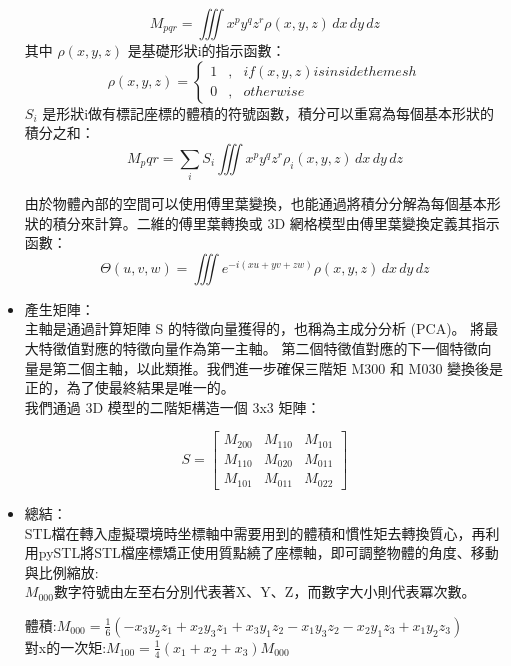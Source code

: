 \begin{itemize}
$$M_{pqr} = \iiint x^{p} y^{q} z^{r} \rho (x,y,z) \,dx\,dy\,dz$$
其中 $\rho (x,y,z)$ 是基礎形狀i的指示函數：\\
\begin{equation}
\label{eq6}
\rho (x,y,z) = \left\{
\begin{aligned}
1 & , & if (x,y,z) is inside the mesh\\
0 & , &              otherwise
\end{aligned}
\right.
\end{equation}
$S_i$ 是形狀i做有標記座標的體積的符號函數，積分可以重寫為每個基本形狀的積分之和：\\
$$M_pqr = \sum_{i} S_i \iiint x^{p} y^{q} z^{r} \rho_i (x,y,z) \,dx\,dy\,dz$$

由於物體內部的空間可以使用傅里葉變換，也能通過將積分分解為每個基本形狀的積分來計算。二維的傅里葉轉換或 3D 網格模型由傅里葉變換定義其指示函數：\\

$$ \Theta (u,v,w) = \iiint e^{-i (xu+yv+zw)} \rho (x,y,z) \,dx\,dy\,dz $$

\item 產生矩陣：\\
主軸是通過計算矩陣 S 的特徵向量獲得的，也稱為主成分分析 (PCA)。 將最大特徵值對應的特徵向量作為第一主軸。 第二個特徵值對應的下一個特徵向量是第二個主軸，以此類推。我們進一步確保三階矩 M300 和 M030 變換後是正的，為了使最終結果是唯一的。\\

我們通過 3D 模型的二階矩構造一個 3x3 矩陣：

\[ 
S=\begin{bmatrix} 
M_{200} & M_{110} & M_{101} \\
M_{110} & M_{020} & M_{011} \\
M_{101} & M_{011} & M_{022} 
\end{bmatrix}
\]

\item 總結：\\
STL檔在轉入虛擬環境時坐標軸中需要用到的體積和慣性矩去轉換質心，再利用pySTL將STL檔座標矯正使用質點繞了座標軸，即可調整物體的角度、移動與比例縮放:\\

$M_{000}$數字符號由左至右分別代表著X、Y、Z，而數字大小則代表冪次數。


體積:$M_{000} = \frac{1}{6}(-x_3 y_2 z_1 + x_2 y_3 z_1 + x_3 y_1 z_2 - x_1 y_3 z_2 - x_2 y_1 z_3 + x_1 y_2 z_3) $\\

對x的一次矩:$M_{100} = \frac{1}{4}(x_1 + x_2 + x_3) M_{000} $\\


\end{itemize}
